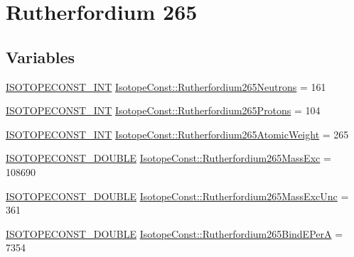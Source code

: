 \hypertarget{group___isotope_const-_rutherfordium-_rf265}{}\section{Rutherfordium 265}
\label{group___isotope_const-_rutherfordium-_rf265}
\subsection*{Variables}
\begin{DoxyCompactItemize}
\item 
\mbox{\hyperlink{group___isotope_const-_macros_ga5f18360b3e99483a35c32d789e62621c}{I\+S\+O\+T\+O\+P\+E\+C\+O\+N\+S\+T\+\_\+\+I\+NT}} \mbox{\hyperlink{group___isotope_const-_rutherfordium-_rf265_gabfc884aa59c48aa60342093233ac59f0}{Isotope\+Const\+::\+Rutherfordium265\+Neutrons}} = 161
\item 
\mbox{\hyperlink{group___isotope_const-_macros_ga5f18360b3e99483a35c32d789e62621c}{I\+S\+O\+T\+O\+P\+E\+C\+O\+N\+S\+T\+\_\+\+I\+NT}} \mbox{\hyperlink{group___isotope_const-_rutherfordium-_rf265_gac147c473755271dac1c5a95c4655d43b}{Isotope\+Const\+::\+Rutherfordium265\+Protons}} = 104
\item 
\mbox{\hyperlink{group___isotope_const-_macros_ga5f18360b3e99483a35c32d789e62621c}{I\+S\+O\+T\+O\+P\+E\+C\+O\+N\+S\+T\+\_\+\+I\+NT}} \mbox{\hyperlink{group___isotope_const-_rutherfordium-_rf265_gaae2e2af8a63d1580cefe5d6e0e1087e1}{Isotope\+Const\+::\+Rutherfordium265\+Atomic\+Weight}} = 265
\item 
\mbox{\hyperlink{group___isotope_const-_macros_ga8f45a7272ce02c0b4c65c44636ed719a}{I\+S\+O\+T\+O\+P\+E\+C\+O\+N\+S\+T\+\_\+\+D\+O\+U\+B\+LE}} \mbox{\hyperlink{group___isotope_const-_rutherfordium-_rf265_ga6eaed071bf9bcb96a630dfae59b673e1}{Isotope\+Const\+::\+Rutherfordium265\+Mass\+Exc}} = 108690
\item 
\mbox{\hyperlink{group___isotope_const-_macros_ga8f45a7272ce02c0b4c65c44636ed719a}{I\+S\+O\+T\+O\+P\+E\+C\+O\+N\+S\+T\+\_\+\+D\+O\+U\+B\+LE}} \mbox{\hyperlink{group___isotope_const-_rutherfordium-_rf265_ga7fe4d864cd1795fdcb85cb4cf71ac224}{Isotope\+Const\+::\+Rutherfordium265\+Mass\+Exc\+Unc}} = 361
\item 
\mbox{\hyperlink{group___isotope_const-_macros_ga8f45a7272ce02c0b4c65c44636ed719a}{I\+S\+O\+T\+O\+P\+E\+C\+O\+N\+S\+T\+\_\+\+D\+O\+U\+B\+LE}} \mbox{\hyperlink{group___isotope_const-_rutherfordium-_rf265_ga0030a13ebc6ca11bedb0b9ebfee3c7ac}{Isotope\+Const\+::\+Rutherfordium265\+Bind\+E\+PerA}} = 7354

\end{DoxyCompactItemize}
